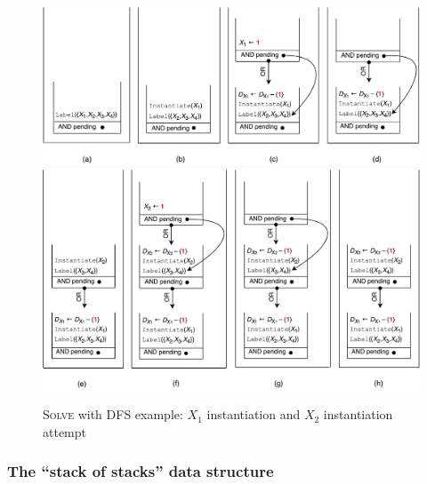 \documentclass{ws-ijait}
\begin{document}
\begin{figure}
  \includegraphics[width=\textwidth]{figures/stacks/abcd}
  \includegraphics[width=\textwidth]{figures/stacks/efgh}
  \caption{\textsc{Solve} with DFS example: $X_1$
           instantiation and $X_2$ instantiation
           attempt\label{a2h}}
\end{figure}

\subsubsection{The ``stack of stacks'' data structure}
\end{document}
